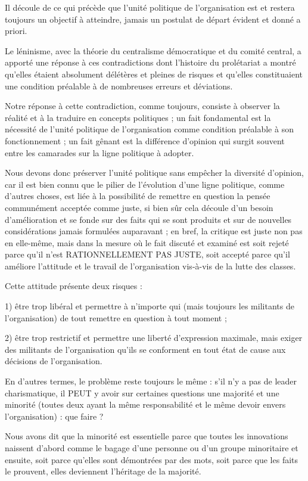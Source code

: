 Il découle de ce qui précède que l'unité politique de l'organisation est et restera toujours un objectif à atteindre, jamais un postulat de départ évident et donné a priori.

Le léninisme, avec la théorie du centralisme démocratique et du comité central, a apporté une réponse à ces contradictions dont l'histoire du prolétariat a montré qu'elles étaient absolument délétères et pleines de risques et qu'elles constituaient une condition préalable à de nombreuses erreurs et déviations.

Notre réponse à cette contradiction, comme toujours, consiste à observer la réalité et à la traduire en concepts politiques ; un fait fondamental est la nécessité de l'unité politique de l'organisation comme condition préalable à son fonctionnement ; un fait gênant est la différence d'opinion qui surgit souvent entre les camarades sur la ligne politique à adopter.

Nous devons donc préserver l'unité politique sans empêcher la diversité d'opinion, car il est bien connu que le pilier de l'évolution d'une ligne politique, comme d'autres choses, est liée à la possibilité de remettre en question la pensée communément acceptée comme juste, si bien sûr cela découle d'un besoin d'amélioration et se fonde sur des faits qui se sont produits et sur de nouvelles considérations jamais formulées auparavant ; en bref, la critique est juste non pas en elle-même, mais dans la mesure où le fait discuté et examiné est soit rejeté parce qu'il n'est RATIONNELLEMENT PAS JUSTE, soit accepté parce qu'il améliore l'attitude et le travail de l'organisation vis-à-vis de la lutte des classes.

Cette attitude présente deux risques :

1) être trop libéral et permettre à n'importe qui (mais toujours les militants de l'organisation) de tout remettre en question à tout moment ;

2) être trop restrictif et permettre une liberté d'expression maximale, mais exiger des militants de l'organisation qu'ils se conforment en tout état de cause aux décisions de l'organisation.

En d'autres termes, le problème reste toujours le même : s'il n'y a pas de leader charismatique, il PEUT y avoir sur certaines questions une majorité et une minorité (toutes deux ayant la même responsabilité et le même devoir envers l'organisation) : que faire ?

Nous avons dit que la minorité est essentielle parce que toutes les innovations naissent d'abord comme le bagage d'une personne ou d'un groupe minoritaire et ensuite, soit parce qu'elles sont démontrées par des mots, soit parce que les faits le prouvent, elles deviennent l'héritage de la majorité.

